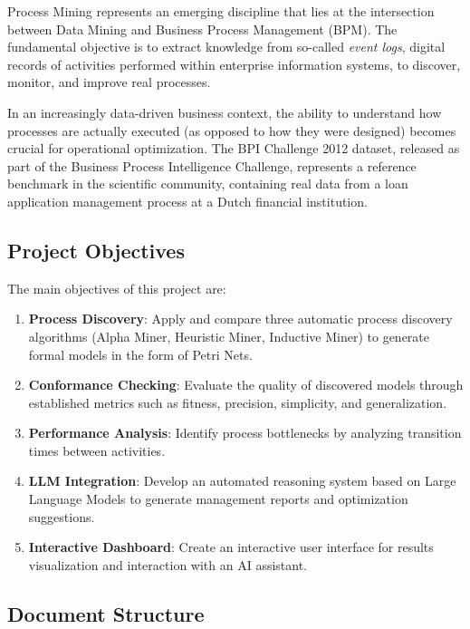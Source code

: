 \documentclass[a4paper,twoside,12pt]{article}
\begin{document}
Process Mining represents an emerging discipline that lies at the intersection between Data Mining and Business Process Management (BPM). The fundamental objective is to extract knowledge from so-called \textit{event logs}, digital records of activities performed within enterprise information systems, to discover, monitor, and improve real processes.

In an increasingly data-driven business context, the ability to understand how processes are actually executed (as opposed to how they were designed) becomes crucial for operational optimization. The BPI Challenge 2012 dataset, released as part of the Business Process Intelligence Challenge, represents a reference benchmark in the scientific community, containing real data from a loan application management process at a Dutch financial institution.

\subsection{Project Objectives}

The main objectives of this project are:

\begin{enumerate}
    \item \textbf{Process Discovery}: Apply and compare three automatic process discovery algorithms (Alpha Miner, Heuristic Miner, Inductive Miner) to generate formal models in the form of Petri Nets.
    
    \item \textbf{Conformance Checking}: Evaluate the quality of discovered models through established metrics such as fitness, precision, simplicity, and generalization.
    
    \item \textbf{Performance Analysis}: Identify process bottlenecks by analyzing transition times between activities.
    
    \item \textbf{LLM Integration}: Develop an automated reasoning system based on Large Language Models to generate management reports and optimization suggestions.
    
    \item \textbf{Interactive Dashboard}: Create an interactive user interface for results visualization and interaction with an AI assistant.
\end{enumerate}

\subsection{Document Structure}
\end{document}
